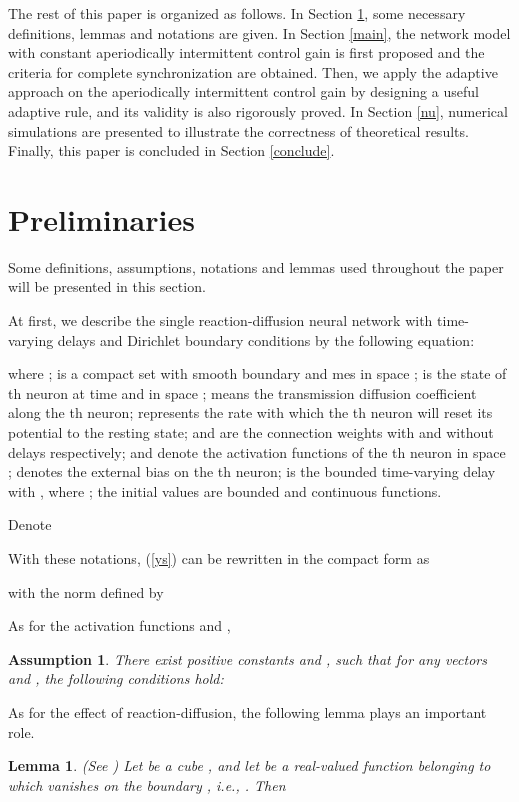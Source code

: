 \documentclass[review]{elsarticle}
\newtheorem{lem}{Lemma}
\newtheorem{asu}{Assumption}
\begin{document}
The rest of this paper is organized as follows. In Section \ref{pre}, some necessary definitions, lemmas and notations are given. In Section \ref{main}, the network model with constant aperiodically intermittent control gain is first proposed and the criteria for complete synchronization are obtained. Then, we apply the adaptive approach on the aperiodically intermittent control gain by designing a useful adaptive rule, and its validity is also rigorously proved. In Section \ref{nu}, numerical simulations are presented to illustrate the correctness of theoretical results. Finally, this paper is concluded in Section \ref{conclude}.

\section{Preliminaries}\label{pre}
Some definitions, assumptions, notations and lemmas used throughout the paper will be presented in this section.

At first, we describe the single reaction-diffusion neural network with time-varying delays and
Dirichlet boundary conditions by the following equation:

where ;  is a compact set with smooth boundary  and mes in space ;  is the state of th neuron at time  and in space
;  means the transmission diffusion coefficient along the th neuron;  represents the rate with which the th neuron will reset its potential to the resting state;  and  are the connection weights with and without delays respectively;  and  denote the activation functions of the th neuron in space ;  denotes the external bias on the th neuron;  is the bounded time-varying delay with , where ; the initial values  are bounded and continuous functions.

Denote

With these notations, (\ref{ys}) can be rewritten in the compact
form as

with the norm  defined by


As for the activation functions  and ,
\begin{asu}\label{add}
There exist positive constants  and , such that for any vectors  and , the following conditions hold:

\end{asu}

As for the effect of reaction-diffusion, the following lemma plays an important role.
\begin{lem}\label{use} (See \cite{Lu2008})
Let  be a cube , and let  be a real-valued function belonging to  which vanishes on the boundary , i.e., . Then

\end{lem}
\end{document}

